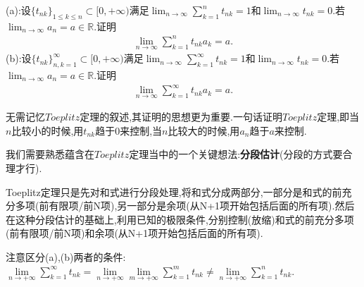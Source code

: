 \documentclass[lang=cn,newtx,10pt,scheme=chinese]{elegantbook}
\begin{document}
\begin{theorem}[Toeplitz定理]\label{theorem:Toeplitz定理}
(a):设\(\{t_{nk}\}_{1\leqslant k\leqslant n} \subset [0, +\infty)\)满足\(\lim_{n \to \infty} \sum\limits_{k = 1}^{n} t_{nk} = 1\)和\(\lim_{n \to \infty} t_{nk} = 0\).若\(\lim_{n \to \infty} a_n = a \in \mathbb{R}\).证明
\begin{align}\label{equation:2.5}
\lim_{n \to \infty} \sum\limits_{k = 1}^{n} t_{nk}a_k = a.
\end{align}
(b):设\(\{t_{nk}\}_{n,k = 1}^{\infty} \subset [0, +\infty)\)满足\(\lim_{n \to \infty} \sum\limits_{k = 1}^{\infty} t_{nk} = 1\)和\(\lim_{n \to \infty} t_{nk} = 0\).若\(\lim_{n \to \infty} a_n = a \in \mathbb{R}\).证明
\begin{align}\label{equation:2.6}
\lim_{n \to \infty} \sum\limits_{k = 1}^{\infty} t_{nk}a_k = a.
\end{align}
\end{theorem}
\begin{note}
无需记忆$Toeplitz$定理的叙述,其证明的思想更为重要.一句话证明$Toeplitz$定理,即当\(n\)比较小的时候,用\(t_{nk}\)趋于\(0\)来控制,当\(n\)比较大的时候,用\(a_n\)趋于\(a\)来控制.

我们需要熟悉蕴含在$Toeplitz$定理当中的一个关键想法:\textbf{分段估计}(分段的方式要合理才行).

Toeplitz定理只是先对和式进行分段处理,将和式分成两部分,一部分是和式的前充分多项(前有限项/前N项),另一部分是余项(从N+1项开始包括后面的所有项).然后在这种分段估计的基础上,利用已知的极限条件,分别控制(放缩)和式的前充分多项(前有限项/前N项)和余项(从N+1项开始包括后面的所有项).
\end{note}
\begin{remark}
注意区分(a),(b)两者的条件:$\underset{n\rightarrow +\infty}{\lim}\sum\limits_{k=1}^{\infty}{t_{nk}}=\underset{n\rightarrow +\infty}{\lim}\underset{m\rightarrow +\infty}{\lim}\sum\limits_{k=1}^m{t_{nk}}\ne \underset{n\rightarrow +\infty}{\lim}\sum\limits_{k=1}^n{t_{nk}}$.
\end{remark}
\end{document}
